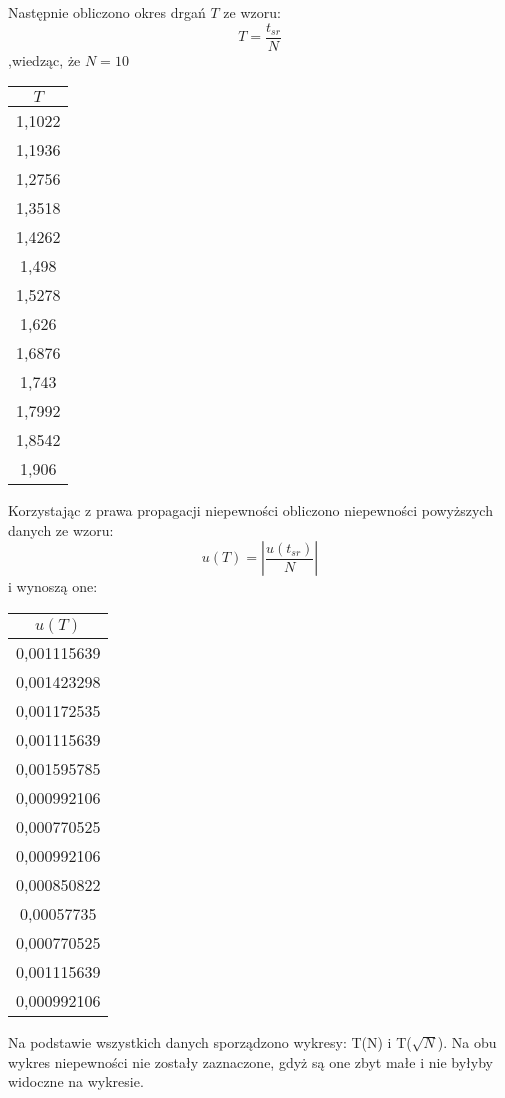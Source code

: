 \documentclass{article}
\begin{document}
\begin{small}
\begin{center}
\end{center}
Następnie obliczono okres drgań $T$ ze wzoru: 
$$ T=\frac{t_{sr}}{N} $$ 
,wiedząc, że $N=10$
\begin{center}
\begin{tabular}{|c|} \hline
 $T$ \\ \hline
1,1022\\ \hline
1,1936\\ \hline
1,2756 \\ \hline
1,3518 \\ \hline
1,4262 \\ \hline
1,498 \\ \hline
1,5278 \\ \hline
1,626  \\ \hline
1,6876  \\ \hline
1,743 \\ \hline
1,7992 \\ \hline
1,8542 \\ \hline
1,906\\ \hline
\end{tabular}
\end{center}
Korzystając z prawa propagacji niepewności obliczono niepewności powyższych danych ze wzoru: $$ u(T)=|\frac{u(t_{sr})}{N}|$$ i wynoszą one:
\begin{center}
\begin{tabular}{|c|} \hline
 $u(T)$ \\ \hline
0,001115639\\ \hline
0,001423298\\ \hline
0,001172535 \\ \hline
0,001115639 \\ \hline
0,001595785\\ \hline
0,000992106\\ \hline
0,000770525 \\ \hline
0,000992106  \\ \hline
0,000850822  \\ \hline
0,00057735 \\ \hline
0,000770525 \\ \hline
0,001115639 \\ \hline
0,000992106\\ \hline
\end{tabular}
\end{center}
Na podstawie wszystkich danych sporządzono wykresy: T(N) i T($\sqrt{N}$). Na obu wykres niepewności nie zostały zaznaczone, gdyż są one zbyt małe i nie byłyby widoczne na wykresie.
\begin{flushleft}



\end{flushleft}
\end{small}
\end{document}
